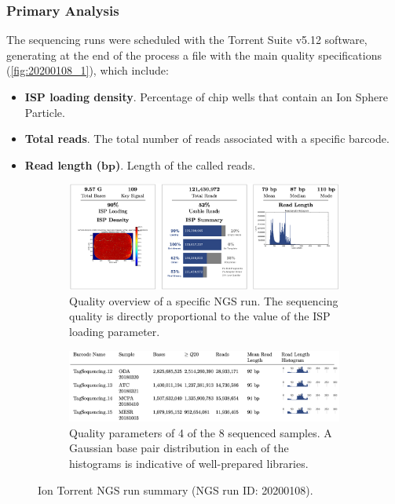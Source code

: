 \subsubsection{Primary Analysis}

The sequencing runs were scheduled with the Torrent Suite\texttrademark{} v5.12 software, generating at the end of the process a file with the main quality specifications (\autoref{fig:20200108_1}), which include:
\begin{itemize}
    \item \textbf{ISP loading density}. Percentage of chip wells that contain an Ion Sphere\texttrademark{} Particle.
    \item \textbf{Total reads}. The total number of reads associated with a specific barcode.
    \item \textbf{Read length ($\boldsymbol{bp}$)}. Length of the called reads.
\end{itemize}

\begin{figure}[ht]
    \centering
    \begin{subfigure}{0.85\textwidth}
        \centering
        \includegraphics[width=\textwidth]{Images/chapter_3/20200108/20200108_1.png}
        \caption{Quality overview of a specific NGS run. The sequencing quality is directly proportional to the value of the ISP loading parameter. \\}
        \label{fig:20200108_1}
    \end{subfigure}
    \hfill
    \begin{subfigure}{0.85\textwidth}
        \centering
        \includegraphics[width=\textwidth]{Images/chapter_3/20200108/20200108_2_v2.png}
        \caption{Quality parameters of 4 of the 8 sequenced samples. A Gaussian  base pair distribution in each of the histograms is indicative of well-prepared libraries.}
        \label{fig:20200108_2}
    \end{subfigure}
    \hfill
    \caption{Ion Torrent\texttrademark{} NGS run summary (NGS run ID: 20200108).}
    \label{fig:NGS_summary}
\end{figure}

